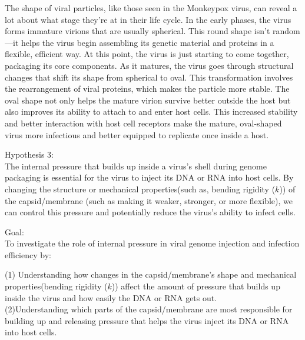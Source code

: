 \documentclass[12pt]{article}
\begin{document}
\begin{flushleft}
The shape of viral particles, like those seen in the Monkeypox virus, can reveal a lot about what stage they’re at in their life cycle. In the early phases, the virus forms immature virions that are usually spherical. This round shape isn’t random—it helps the virus begin assembling its genetic material and proteins in a flexible, efficient way. At this point, the virus is just starting to come together, packaging its core components. As it matures, the virus goes through structural changes that shift its shape from spherical to oval. This transformation involves the rearrangement of viral proteins, which makes the particle more stable. The oval shape not only helps the mature virion survive better outside the host but also improves its ability to attach to and enter host cells. This increased stability and better interaction with host cell receptors make the mature, oval-shaped virus more infectious and better equipped to replicate once inside a host.
	
\noindent Hypothesis 3:\\
The internal pressure that builds up inside a virus’s shell during genome packaging is essential for the virus to inject its DNA or RNA into host cells. By changing the structure or mechanical properties(such as, bending rigidity ($k$)) of the capsid/membrane (such as making it weaker, stronger, or more flexible), we can control this pressure and potentially reduce the virus’s ability to infect cells.

\noindent Goal:\\
\noindent To investigate the role of internal pressure in viral genome injection and infection efficiency by:

\noindent (1) Understanding how changes in the capsid/membrane's shape and mechanical properties(bending rigidity ($k$)) affect the amount of pressure that builds up inside the virus and how easily the DNA or RNA gets out.\\

\noindent (2)Understanding which parts of the capsid/membrane are most responsible for building up and releasing pressure that helps the virus inject its DNA or RNA into host cells.\\

	

\end{flushleft}
\end{document}
